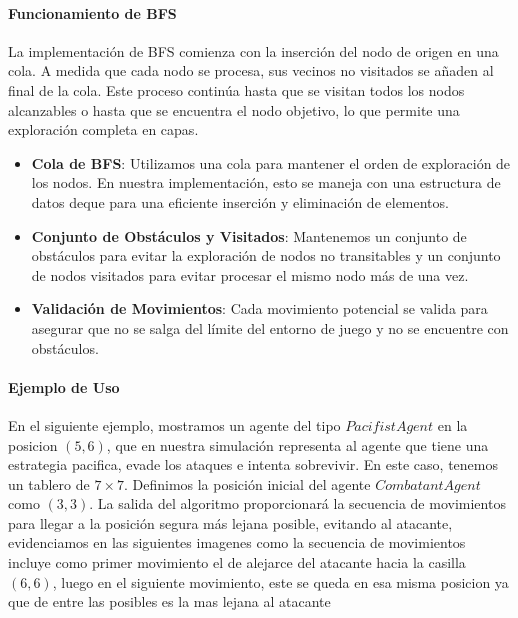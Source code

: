 \documentclass[11pt]{article}
\begin{document}
\paragraph{Funcionamiento de BFS}
La implementación de BFS comienza con la inserción del nodo de origen en una cola. A medida que cada nodo se procesa, sus vecinos no visitados se añaden al final de la cola. Este proceso continúa hasta que se visitan todos los nodos alcanzables o hasta que se encuentra el nodo objetivo, lo que permite una exploración completa en capas.

\begin{itemize}
    \item \textbf{Cola de BFS}: Utilizamos una cola para mantener el orden de exploración de los nodos. En nuestra implementación, esto se maneja con una estructura de datos deque para una eficiente inserción y eliminación de elementos.
    \item \textbf{Conjunto de Obstáculos y Visitados}: Mantenemos un conjunto de obstáculos para evitar la exploración de nodos no transitables y un conjunto de nodos visitados para evitar procesar el mismo nodo más de una vez.
    \item \textbf{Validación de Movimientos}: Cada movimiento potencial se valida para asegurar que no se salga del límite del entorno de juego y no se encuentre con obstáculos.
\end{itemize}

\paragraph{Ejemplo de Uso}
En el siguiente ejemplo, mostramos un agente del tipo $PacifistAgent$ en la posicion \( (5, 6) \), que en nuestra simulación representa al agente que tiene una estrategia pacifica, evade los ataques e intenta sobrevivir.
En este caso, tenemos un tablero de \(7 \times 7\). Definimos la posición inicial del agente $CombatantAgent$ como \( (3, 3) \). La salida del algoritmo proporcionará la secuencia de movimientos para llegar a la posición segura más lejana posible, evitando al atacante, evidenciamos en las siguientes imagenes como
la secuencia de movimientos incluye como primer movimiento el de alejarce del atacante hacia la casilla \( (6, 6) \), luego en el siguiente movimiento, este se queda en esa misma posicion ya que de entre las posibles es la mas lejana al atacante
\end{document}
